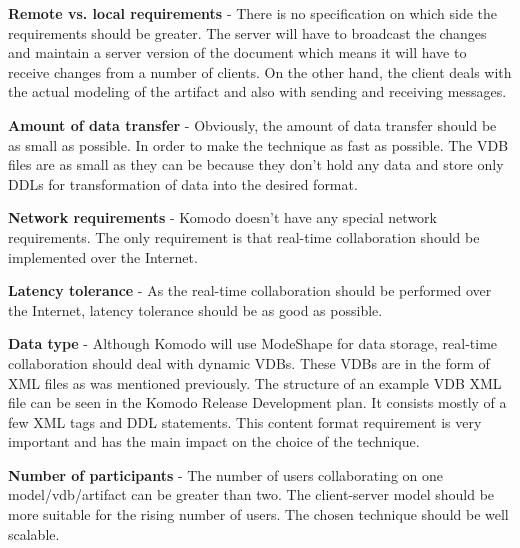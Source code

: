 \documentclass[12pt,oneside]{fithesis2}
\begin{document}
\vspace{3mm} 

\textbf{Remote vs. local requirements} - There is no specification on which side the requirements should be greater. The server will have to broadcast the changes and maintain a server version of the document which means it will have to receive changes from a number of clients. On the other hand, the client deals with the actual modeling of the artifact and also with sending and receiving messages.

\vspace{3mm} 

\textbf{Amount of data transfer} - Obviously, the amount of data transfer should be as small as possible. In order to make the technique as fast as possible. The VDB files are as small as they can be because they don't hold any data and store only DDLs for transformation of data into the desired format.

\vspace{3mm} 

\textbf{Network requirements} - Komodo doesn't have any special network requirements. The only requirement is that real-time collaboration should be implemented over the Internet.

\vspace{3mm} 

\textbf{Latency tolerance} - As the real-time collaboration should be performed over the Internet, latency tolerance should be as good as possible.

\vspace{3mm} 

\textbf{Data type} - Although Komodo will use ModeShape for data storage, real-time collaboration should deal with dynamic VDBs. These VDBs are in the form of XML files as was mentioned previously. The structure of an example VDB XML file can be seen in the Komodo Release Development plan\cite{Komodo}. It consists mostly of a few XML tags and DDL statements. This content format requirement is very important and has the main impact on the choice of the technique.

\vspace{3mm} 

\textbf{Number of participants} - The number of users collaborating on one model/vdb/artifact can be greater than two. The client-server model should be more suitable for the rising number of users. The chosen technique should be well scalable.

\vspace{3mm} 
\end{document}
